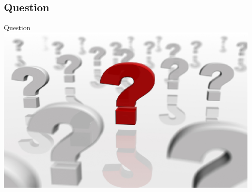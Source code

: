 \documentclass[t,compress,athserif,xcolor=pst,dvips]{beamer}
\begin{document}
	\subsection{Question} 
	\begin{frame}[c]{Question}
		\includegraphics[scale=.42]{questions.eps}
	\end{frame}
	
\end{document}
